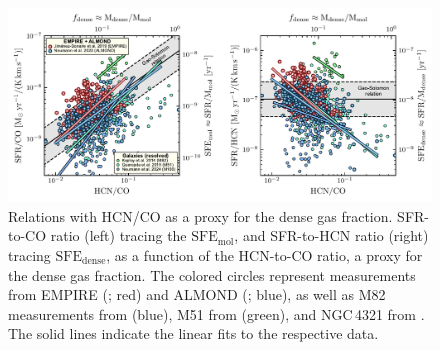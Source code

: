 \documentclass[letter, longauth]{aa} %
\begin{document}
\begin{figure}
\centering
\includegraphics[width=\textwidth]{Figures/SFE_mol_and_dense_vs_fdense_relation_compressed.pdf}
\caption{Relations with HCN/CO as a proxy for the dense gas fraction. SFR-to-CO ratio (left) tracing the $\mathrm{SFE}_\mathrm{mol}$, and SFR-to-HCN ratio (right) tracing $\mathrm{SFE}_\mathrm{dense}$, as a function of the HCN-to-CO ratio, a proxy for the dense gas fraction. The colored circles represent measurements from EMPIRE (\citealp{Jimenez-Donaire2019}; red) and ALMOND (\citealp{Neumann2023a}; blue), as well as M82 measurements from \citet{Kepley2014} (blue), M51 from \citet{Querejeta2019} (green), and NGC\,4321 from \citet{Neumann2024}. The solid lines indicate the linear fits to the respective data.
}
\label{fig:hcn_ratio_relations}
\end{figure}

\end{document}
